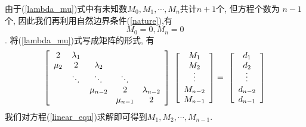 \documentclass[a4paper]{article}
\begin{document}
\begin{spacing}{1.5}
\begin{CJK*}{GBK}{song}
由于(\ref{lambda_mu})式中有未知数$M_0,M_1,\cdots,M_n$共计$n+1$个, 但方程个数为 $n-1$ 个, 因此我们再利用自然边界条件(\ref{nature}),有$$M_0=0, M_n=0$$.
将(\ref{lambda_mu})式写成矩阵的形式, 有
\begin{equation}\label{linear_equ}
\left[                %
            \begin{array}{ccccc}   %
            2&\lambda_1 & & &  \\  %
            \mu_2 & 2& \lambda_2& & \\  %
             & \rotatebox{-45}{$\cdots$} &\rotatebox{-45}{$\cdots$}&\rotatebox{-45}{$\cdots$} &  \\
             & &\mu_{n-2} & 2 & \lambda_{n-2} \\
             & & & \mu_{n-1} & 2 \\
            \end{array}
            \right]             %
\
\left[
            \begin{array}{c}
            M_1 \\
            M_2 \\
            \rotatebox{90}{$\cdots$} \\
            M_{n-2}\\
            M_{n-1}\\
            \end{array}
            \right]
=
\
\left[
            \begin{array}{c}
            d_1 \\
            d_2 \\
            \rotatebox{90}{$\cdots$} \\
            d_{n-2}\\
            d_{n-1}\\
            \end{array}
            \right]
\end{equation}
我们对方程(\ref{linear_equ})求解即可得到$M_1, M_2,\cdots, M_{n-1}$.


\end{CJK*}
\end{spacing}
\end{document}
